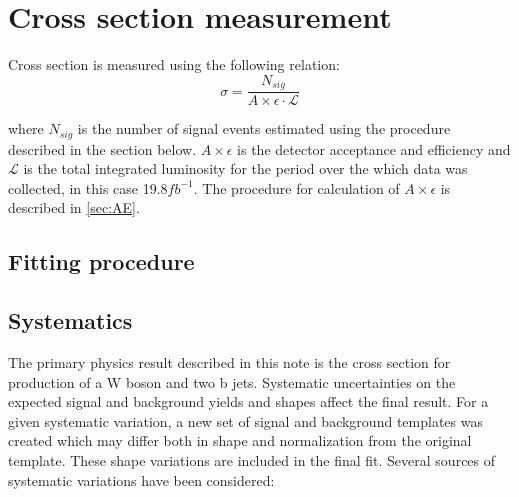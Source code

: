 
\chapter{Cross section measurement} %

\label{Chapter7} %


Cross section is measured using the following relation:
\begin{equation}
\sigma = \frac{N_{sig}}{A\times \epsilon \cdot \mathcal{L}}
\end{equation}

where $N_{sig}$ is the number of signal events estimated using the procedure described in the section below. $A\times \epsilon$ is the detector acceptance and efficiency and $\mathcal{L}$ is the total integrated luminosity for the period over the which data was collected, in this case 19.8$fb^{-1}$. The procedure for calculation of $A\times \epsilon$ is described in \ref{sec:AE}.


\section{Fitting procedure}



\section{Systematics}

The primary physics result described in this note is the cross section for production of a W boson and two b
jets. Systematic uncertainties on the expected signal and background yields and shapes affect
the final result. For a given systematic variation, a new set of signal and background templates was created which may differ both in shape and normalization from the original template.  These shape variations are included in the final fit. Several sources of systematic variations have been considered:

